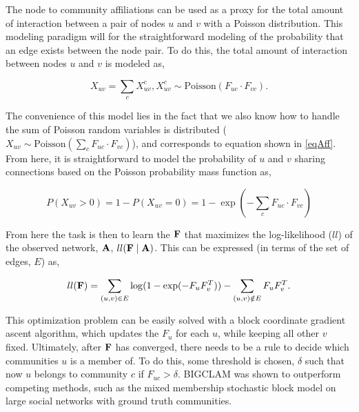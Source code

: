 The node to community affiliations can be used as a proxy for the total amount of interaction between a pair of nodes $u$ and $v$ with a Poisson distribution. This modeling paradigm will for the straightforward modeling of the probability that an edge exists between the node pair. To do this, the total amount of interaction between nodes $u$ and $v$ is modeled as,

\begin{equation}
X_{uv}=\sum_{c}X_{uv}^{c}, X_{uv}^{c} \sim \text{Poisson}(F_{uc}\cdot F_{vc}).
\end{equation}

The convenience of this model lies in the fact that we also know how to handle the sum of Poisson random variables is distributed ($X_{uv} \sim \text{Poisson}(\sum_{c}F_{uc}\cdot F_{vc})$), and corresponds to equation shown in \ref{eqAff}. From here, it is straightforward to model the probability of $u$ and $v$ sharing connections based on the Poisson probability mass function as,

\begin{equation}
P(X_{uv}>0)=1-P(X_{uv}=0)=1-\exp(-\sum_{c}F_{uc}\cdot F_{vc})
\end{equation}

From here the task is then to learn the ${\bf F}$ that maximizes the log-likelihood ($ll$) of the observed network, ${\bf A}$, $ll({\bf F} \mid {\bf A})$. This can be expressed (in terms of the set of edges, $E$) as,

\begin{equation}
ll({\bf F})=\sum_{(u,v) \in E} \log(1-\exp(-F_{u}F_{v}^{T}))- \sum_{(u,v) \notin E} F_{u}F_{v}^{T}.
\end{equation}

This optimization problem can be easily solved with a block coordinate gradient ascent algorithm, which updates the $F_{u}$ for each $u$, while keeping all other $v$ fixed. Ultimately, after ${\bf F}$ has converged, there needs to be a rule to decide which communities $u$ is a member of. To do this, some threshold is chosen, $\delta$ such that now $u$ belongs to community $c$ if $F_{uc}>\delta$. BIGCLAM was shown to outperform competing methods, such as the mixed membership stochastic block model on large social networks with ground truth communities. 


